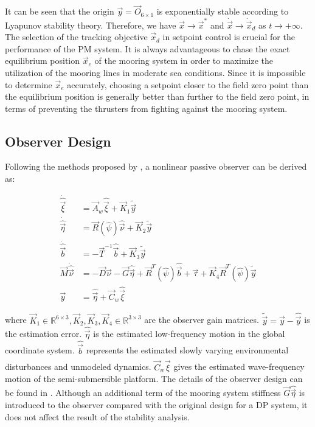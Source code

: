 \begin{sloppypar}
\noindent It can be seen that the origin $\vec{y} = \vec{O}_{6\times1}$ is exponentially stable according to Lyapunov stability theory. Therefore, we have $\vec{x} \to \vec{x}^*$ and $\dot{\vec{x}} \to \dot{\vec{x}}_d$ as $t \to +\infty$. The selection of the tracking objective $\vec{x}_d$ in setpoint control is crucial for the performance of the PM system. It is always advantageous to chase the exact equilibrium position $\vec{x}_e$ of the mooring system in order to maximize the utilization of the mooring lines in moderate sea conditions. Since it is impossible to determine $\vec{x}_e$ accurately, choosing a setpoint closer to the field zero point than the equilibrium position is generally better than further to the field zero point, in terms of preventing the thrusters from fighting against the mooring system.

\subsection{Observer Design}
Following the methods proposed by \cite{fossen1999passive}, a nonlinear passive observer can be derived as:

\begin{align}
\dot{\hat{\vec{\xi}}} &= \vec{A}_w\hat{\vec{\xi}} + \vec{K}_1\tilde{\vec{y}} \\
\dot{\hat{\vec{\eta}}} &= \vec{R}(\hat{\psi})\hat{\vec{\nu}} + \vec{K}_2\tilde{\vec{y}} \\
\dot{\hat{\vec{b}}} &= -\vec{T}^{-1}\hat{\vec{b}} + \vec{K}_3\tilde{\vec{y}} \\
\vec{M}\dot{\hat{\vec{\nu}}} &= -\vec{D}\hat{\vec{\nu}} - \vec{G}\hat{\vec{\eta}} + \vec{R}^T(\hat{\psi})\hat{\vec{b}} + \vec{\tau} + \vec{K}_4\vec{R}^T(\hat{\psi})\tilde{\vec{y}} \\
\vec{y} &= \hat{\vec{\eta}} + \vec{C}_w\hat{\vec{\xi}}
\end{align}

\noindent where $\vec{K}_1 \in \mathbb{R}^{6\times3}, \vec{K}_2, \vec{K}_3, \vec{K}_4 \in \mathbb{R}^{3\times3}$ are the observer gain matrices. $\tilde{\vec{y}} = \vec{y}-\hat{\vec{y}}$ is the estimation error. $\hat{\vec{\eta}}$ is the estimated low-frequency motion in the global coordinate system. $\hat{\vec{b}}$ represents the estimated slowly varying environmental disturbances and unmodeled dynamics. $\vec{C}_w\hat{\vec{\xi}}$ gives the estimated wave-frequency motion of the semi-submersible platform. The details of the observer design can be found in \cite{fossen1999passive}. Although an additional term of the mooring system stiffness $\vec{G}\hat{\vec{\eta}}$ is introduced to the observer compared with the original design for a DP system, it does not affect the result of the stability analysis.



\end{sloppypar}
